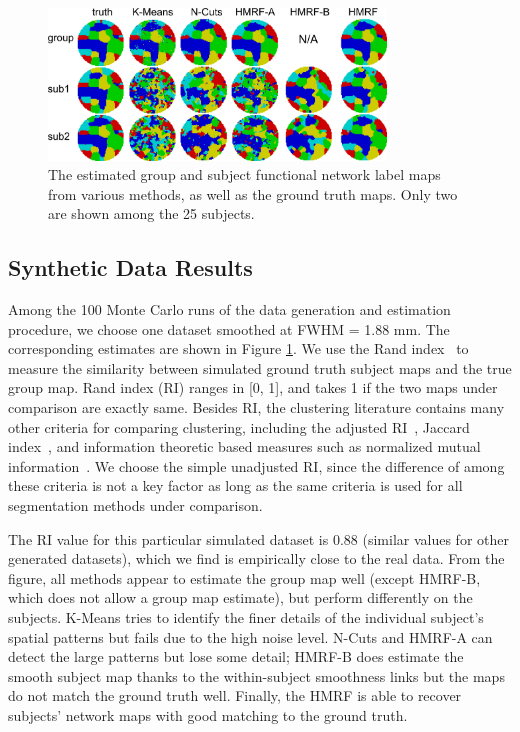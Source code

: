 \documentclass[review,authoryear]{elsarticle}
\begin{document}
\begin{figure}[htb]
  \centering
  \includegraphics[width=0.8\textwidth]{figures/syn/allmaps}
  \caption{The estimated group and subject functional network label maps from
    various methods, as well as the ground truth maps. Only two are shown among
    the 25 subjects. }
  \label{fig:synmap}
\end{figure}

\subsection{Synthetic Data Results}
Among the 100 Monte Carlo runs of the data generation and estimation procedure,
we choose one dataset smoothed at FWHM = 1.88 mm. The corresponding estimates
are shown in Figure \ref{fig:synmap}. We use the Rand
index~\citep{rand1971objective} to measure the similarity between simulated
ground truth subject maps and the true group map. Rand index (RI) ranges in [0,
  1], and takes 1 if the two maps under comparison are exactly same.  Besides
RI, the clustering literature contains many other criteria for comparing
clustering, including the adjusted RI~\citep{hubert1985comparing}, Jaccard
index~\citep{ben2001stability}, and information theoretic based measures such as
normalized mutual information~\citep{vinh2009information}. We choose the simple
unadjusted RI, since the difference of among these criteria is not a key factor
as long as the same criteria is used for all segmentation methods under
comparison.

The RI value for this particular simulated dataset is 0.88 (similar values for
other generated datasets), which we find is empirically close to the real data.
From the figure, all methods appear to estimate the group map well (except
HMRF-B, which does not allow a group map estimate), but perform differently on
the subjects. K-Means tries to identify the finer details of the individual
subject's spatial patterns but fails due to the high noise level. N-Cuts and
HMRF-A can detect the large patterns but lose some detail; HMRF-B does estimate
the smooth subject map thanks to the within-subject smoothness links but the
maps do not match the ground truth well. Finally, the HMRF is able to recover
subjects' network maps with good matching to the ground truth.
\end{document}

